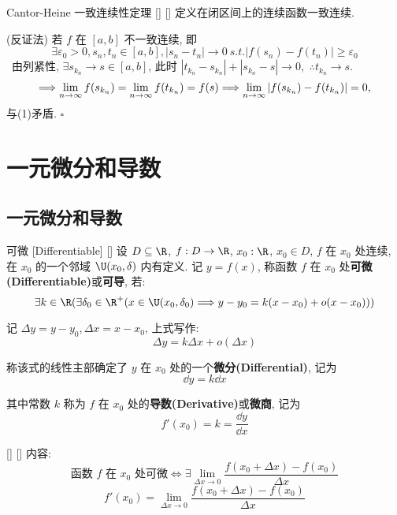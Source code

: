 \documentclass[UTF8]{ctexart}
\begin{document}
			\begin{thm}
			    []
			    {Cantor-Heine 一致连续性定理}
			    []
			    []
				定义在闭区间上的连续函数一致连续. 
			\end{thm}

    		\begin{prf}
				 (反证法) 若 \(f\) 在 \([a,b]\) 不一致连续, 即
				\[\exists\varepsilon_0>0,s_n,t_n\in[a,b],|s_n-t_n|\to 0\ s.t.|f(s_n)-f(t_n)|\geq\varepsilon_0\tag{1}\]\ 
				由列紧性,  \(\exists s_{k_n}\to s\in[a,b]\),
				此时 \(|t_{k_n}-s_{k_n}|+|s_{k_n}-s|\to 0\),\ \(\therefore t_{k_n}\to s\).
				\[\Longrightarrow\lim_{n\to\infty}f(s_{k_n})=\lim_{n\to\infty}f(t_{k_n})=f(s) \\
				\Longrightarrow\lim_{n\to\infty}|f(s_{k_n})-f(t_{k_n})|=0,\]
				与(1)矛盾. \(\square\)
			\end{prf}
				


		
	
	\section{一元微分和导数}
		
		\subsection{一元微分和导数}
		
			\begin{dfn}
			    []
			    {可微}
			    [Differentiable]
			    []
				设 \(D\subseteq\R\), \(f:D\to\R\), \(x_0:\R\), \(x_0\in D\), \(f\) 在 \(x_0\) 处连续, 在 \(x_0\) 的一个邻域 \(\U(x_0,\delta)\) 内有定义. 记 \(y=f(x)\), 称函数 \(f\) 在 \(x_0\) 处\textbf{可微(Differentiable)}或\textbf{可导}, 若: 
				\[\exists k\in\R(\exists\delta_0\in\R^+(x\in\U(x_0,\delta_0)\Longrightarrow y-y_0=k(x-x_0)+o(x-x_0)))\]
				
				记 \(\Delta y=y-y_0,\Delta x=x-x_0\), 上式写作: 
				\[\Delta y=k\Delta x+o(\Delta x)\]
				
				称该式的线性主部确定了 \(y\) 在 \(x_0\) 处的一个\textbf{微分(Differential)}, 记为
				\[\dd y=k\dd x\]
				
				其中常数 \(k\) 称为 \(f\) 在 \(x_0\) 处的\textbf{导数(Derivative)}或\textbf{微商}, 记为
				\[f'(x_0)=k=\frac{\dd y}{\dd x}\]
			\end{dfn}
			
			\begin{ppt}
			    []
			    {}
			    []
			    []
				内容: 
				\[\mbox{函数 \(f\) 在 \(x_0\) 处可微}\iff\exists\lim_{\Delta x\to 0}\frac{f(x_0+\Delta x)-f(x_0)}{\Delta x}\]
				\[f'(x_0)=\lim_{\Delta x\to 0}\frac{f(x_0+\Delta x)-f(x_0)}{\Delta x}\]
			\end{ppt}
			
\end{document}
